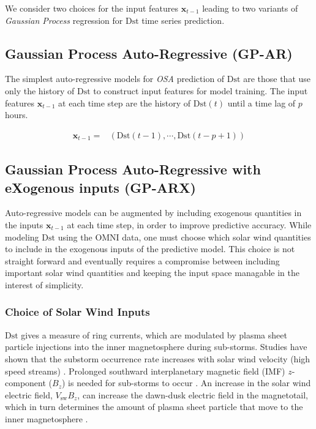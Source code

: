 We consider two choices for the input features $ \mathbf{x}_{t-1}$ leading to two variants of \emph{Gaussian Process} regression for $\mathrm{Dst}$ time series prediction.

\subsection{Gaussian Process Auto-Regressive (GP-AR)} \label{sec:gpar}

The simplest auto-regressive models for \emph{OSA} prediction of $\mathrm{Dst}$ are those that use only the history of $\mathrm{Dst}$ to construct input features for model training. The input features $\mathbf{x}_{t-1}$ at each time step are the history of $\mathrm{Dst}(t)$ until a time lag of $p$ hours.

\begin{align*}
    \mathbf{x}_{t-1} = & \left(\mathrm{Dst}(t-1), \cdots , \mathrm{Dst}(t-p+1)\right)
\end{align*}

\subsection{Gaussian Process Auto-Regressive with eXogenous inputs (GP-ARX)} \label{sec:gparx}

Auto-regressive models can be augmented by including exogenous quantities in the inputs $ \mathbf{x}_{t-1}$ at each time step, in order to improve predictive accuracy. While modeling $\mathrm{Dst}$ using the OMNI data, one must choose which solar wind quantities to include in the exogenous inputs of the predictive model. This choice is not straight forward and eventually requires a compromise between including important solar wind quantities and keeping the input space managable in the interest of simplicity.

\subsubsection{Choice of Solar Wind Inputs}

$ \mathrm{Dst}$ gives a measure of ring currents, which are modulated by plasma sheet particle injections into the inner magnetosphere during sub-storms. Studies have shown that the substorm occurrence rate increases with solar wind velocity (high speed streams) \citet{Kissinger2011,Newell2016}. Prolonged southward interplanetary magnetic field (IMF) $z$-component ($B_z$) is needed for sub-storms to occur \citep{McPherron1986}. An increase in the solar wind electric field, $V_{\text{sw}}B_z$, can increase the dawn-dusk electric field in the magnetotail, which in turn determines the amount of plasma sheet particle that move to the inner magnetosphere \citet{Friedel2001}. 

